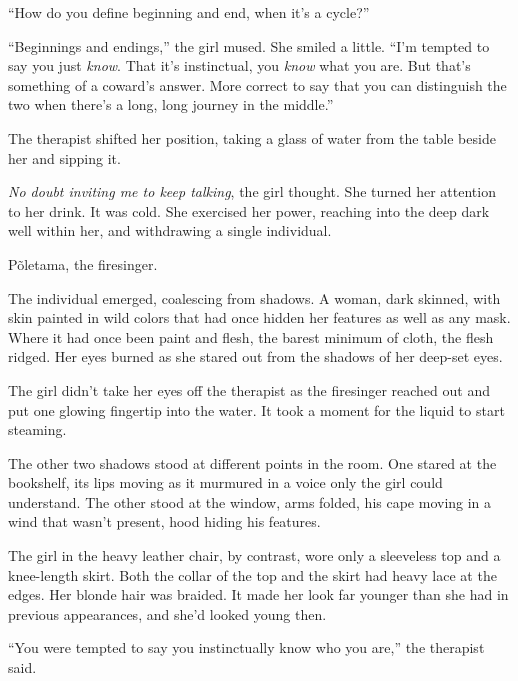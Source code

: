 ``How do you define beginning and end, when it's a cycle?''



``Beginnings and endings,'' the girl mused.  She smiled a little.  ``I'm tempted to say you just \emph{know}.  That it's instinctual, you \emph{know} what you are.  But that's something of a coward's answer.  More correct to say that you can distinguish the two when there's a long, long journey in the middle.''



The therapist shifted her position, taking a glass of water from the table beside her and sipping it.



\emph{No doubt inviting me to keep talking}, the girl thought.  She turned her attention to her drink.  It was cold.  She exercised her power, reaching into the deep dark well within her, and withdrawing a single individual.



P\~{o}letama, the firesinger.



The individual emerged, coalescing from shadows.  A woman, dark skinned, with skin painted in wild colors that had once hidden her features as well as any mask.  Where it had once been paint and flesh, the barest minimum of cloth, the flesh ridged.  Her eyes burned as she stared out from the shadows of her deep-set eyes.



The girl didn't take her eyes off the therapist as the firesinger reached out and put one glowing fingertip into the water.  It took a moment for the liquid to start steaming.



The other two shadows stood at different points in the room.  One stared at the bookshelf, its lips moving as it murmured in a voice only the girl could understand.  The other stood at the window, arms folded, his cape moving in a wind that wasn't present, hood hiding his features.



The girl in the heavy leather chair, by contrast, wore only a sleeveless top and a knee-length skirt.  Both the collar of the top and the skirt had heavy lace at the edges.  Her blonde hair was braided.  It made her look far younger than she had in previous appearances, and she'd looked young then.



``You were tempted to say you instinctually know who you are,'' the therapist said.



